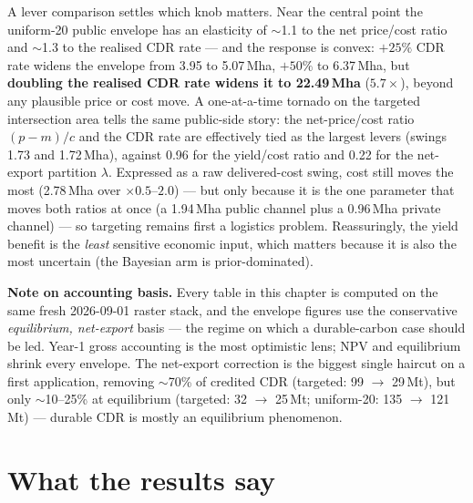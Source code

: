 \documentclass[openany]{book}
\begin{document}
A lever comparison settles which knob matters. Near the central point the
uniform-20 public envelope has an elasticity of $\sim$1.1 to the net price/cost
ratio and $\sim$1.3 to the realised CDR rate --- and the response is convex:
$+25\%$ CDR rate widens the envelope from 3.95 to 5.07\,Mha, $+50\%$ to
6.37\,Mha, but \textbf{doubling the realised CDR rate widens it to 22.49\,Mha}
($5.7\times$), beyond any plausible price or cost move. A one-at-a-time tornado
on the targeted intersection area tells the same public-side story: the
net-price/cost ratio $(p-m)/c$ and the CDR rate are effectively tied as the
largest levers (swings 1.73 and 1.72\,Mha), against 0.96 for the yield/cost
ratio and 0.22 for the net-export partition $\lambda$. Expressed as a raw
delivered-cost swing, cost still moves the most (2.78\,Mha over
$\times0.5$--$2.0$) --- but only because it is the one parameter that moves both
ratios at once (a 1.94\,Mha public channel plus a 0.96\,Mha private channel) ---
so targeting remains first a logistics problem. Reassuringly, the yield benefit
is the \emph{least} sensitive economic input, which matters because it is also
the most uncertain (the Bayesian arm is prior-dominated).

\begin{keybox}
\textbf{Note on accounting basis.} Every table in this chapter is computed on
the same fresh 2026-09-01 raster stack, and the envelope figures use the
conservative \emph{equilibrium, net-export} basis --- the regime on which a
durable-carbon case should be led. Year-1 gross accounting is the most
optimistic lens; NPV and equilibrium shrink every envelope. The net-export
correction is the biggest single haircut on a first application, removing
$\sim$70\% of credited CDR (targeted: 99 $\rightarrow$ 29\,Mt), but only
$\sim$10--25\% at equilibrium (targeted: 32 $\rightarrow$ 25\,Mt; uniform-20:
135 $\rightarrow$ 121\,Mt) --- durable CDR is mostly an equilibrium phenomenon.
\end{keybox}

\section{What the results say}
\end{document}
